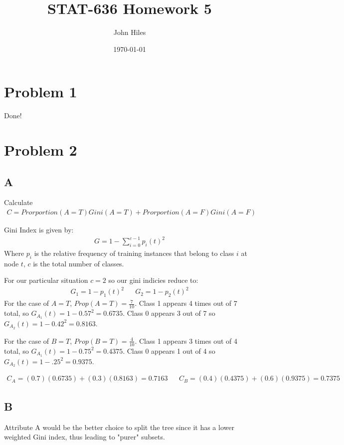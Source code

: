 \documentclass{article}
\title{STAT-636 Homework 5}
\author{John Hiles}
\date\today
\begin{document}
\maketitle %

\section*{Problem 1}
Done!
\section*{Problem 2}
\subsection*{A}
Calculate
\begin{align*}
C = Prorportion(A=T)Gini(A=T)+Prorportion(A=F)Gini(A=F)
\end{align*}

Gini Index is given by:
\begin{align*}
 G = 1-\sum_{i=0}^{c-1} p_i(t)^2
\end{align*}
Where $p_i$ is the relative frequency of training instances that belong to class
$i$ at node $t$, $c$ is the total number of classes.

	For our particular situation $c=2$ so our gini indicies reduce to:
\begin{align*}
 G_1 = 1-p_1(t)^2 && G_2 = 1-p_2(t)^2
\end{align*}
For the case of $A=T$, $Prop(A=T)=\frac{7}{10}$. Class 1 appears 4 times out of 7 total, so $G_{A_1}(t) = 1-0.57^2 = 0.6735$. Class 0 appears 3 out of 7 so $G_{A_2}(t) = 1-0.42^2=0.8163$.

For the case of $B=T$, $Prop(B=T)=\frac{4}{10}$. Class 1 appears 3 times out of 4 total, so $G_{A_1}(t) = 1-0.75^2 = 0.4375$. Class 0 appears 1 out of 4 so $G_{A_2}(t) = 1-.25^2=0.9375$.

\begin{align*}
C_A = (0.7)(0.6735)+(0.3)(0.8163) = 0.7163 && C_B = (0.4)(0.4375)+(0.6)(0.9375) = 0.7375
\end{align*}

\subsection*{B}
Attribute A would be the better choice to split the tree since it has a lower weighted Gini index, thus leading to "purer" subsets.
\clearpage
\end{document}
